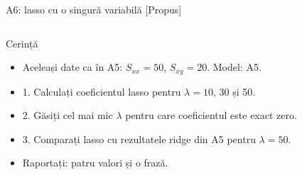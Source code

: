 \begin{frame}{A6: lasso cu o singură variabilă [Propus]}
\propsub
\itemsize{\scriptsize}
\begin{columns}[T]
\begin{column}{\taskw}
\begin{block}{Cerință}
\begin{itemize}
    \item Aceleași date ca în A5: $S_{xx} = 50$, $S_{xy} = 20$. Model: A5.
    \item 1. Calculați coeficientul lasso pentru $\lambda = 10$, 30 și 50.
    \item 2. Găsiți cel mai mic $\lambda$ pentru care coeficientul este exact zero.
    \item 3. Comparați lasso cu rezultatele ridge din A5 pentru $\lambda = 50$.
    \item Raportați: patru valori și o frază.
\end{itemize}
\end{block}
\end{column}
\begin{column}{\solw}
\end{column}
\end{columns}
\end{frame}

